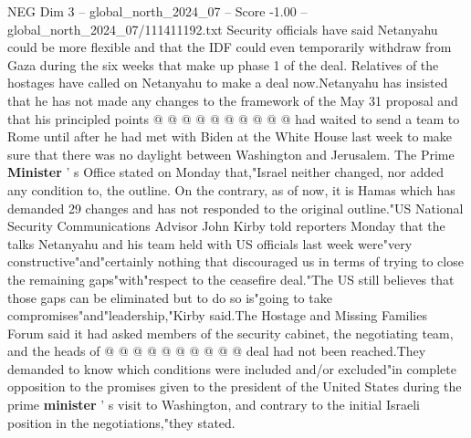 \begin{textsample}{NEG Dim 3 – global\_north\_2024\_07 – Score -1.00 – global\_north\_2024\_07/111411192.txt}
Security officials have said Netanyahu could be more flexible and that the IDF could even temporarily withdraw from Gaza during the six weeks that make up phase 1 of the deal.
Relatives of the hostages have called on Netanyahu to make a deal now.Netanyahu has insisted that he has not made any changes to the framework of the May 31 proposal and that his principled points @ @ @ @ @ @ @ @ @ @ had waited to send a team to Rome until after he had met with Biden at the White House last week to make sure that there was no daylight between Washington and Jerusalem.
The Prime \textbf{Minister} ' s Office stated on Monday that,"Israel neither changed, nor added any condition to, the outline.
On the contrary, as of now, it is Hamas which has demanded 29 changes and has not responded to the original outline."US National Security Communications Advisor John Kirby told reporters Monday that the talks Netanyahu and his team held with US officials last week were"very constructive"and"certainly nothing that discouraged us in terms of trying to close the remaining gaps"with"respect to the ceasefire deal."The US still believes that those gaps can be eliminated but to do so is"going to take compromises"and"leadership,"Kirby said.The Hostage and Missing Families Forum said it had asked members of the security cabinet, the negotiating team, and the heads of @ @ @ @ @ @ @ @ @ @ deal had not been reached.They demanded to know which conditions were included and/or excluded"in complete opposition to the promises given to the president of the United States during the prime \textbf{minister} ' s visit to Washington, and contrary to the initial Israeli position in the negotiations,"they stated.

\end{textsample}
